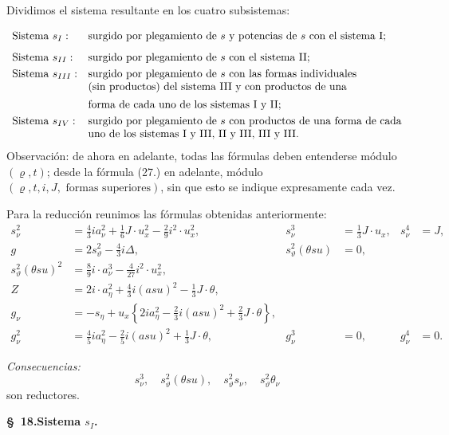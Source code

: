 \documentclass[11pt]{article}
\newcommand{\A}{\Delta}
\begin{document}
Dividimos el sistema resultante en los cuatro subsistemas:
\[
\begin{array}{ll}
\text{Sistema }s_I:&\text{surgido por plegamiento de }s\text{ y potencias de }s\text{ con el sistema I;}\vphantom{\dfrac11}\\
\text{Sistema }s_{II}:&\text{surgido por plegamiento de }s\text{ con el sistema II;}\vphantom{\dfrac11}\\
\text{Sistema }s_{III}:&\text{surgido por plegamiento de }s\text{ con las formas individuales}\\
&\text{(sin productos) del sistema III y con productos de una}\\
&\text{forma de cada uno de los sistemas I y II;}\vphantom{\dfrac11}\\
\text{Sistema }s_{IV}:&\text{surgido por plegamiento de }s\text{ con productos de una forma de cada}\\
&\text{uno de los sistemas I y III, II y III, III y III.}
\end{array}
\]
Observación: de ahora en adelante, todas las fórmulas deben entenderse módulo $(\varrho,t)$; desde la fórmula (27.) en adelante, módulo $(\varrho,t,i,J,\text{ formas superiores})$, sin que esto se indique expresamente cada vez.

Para la reducción reunimos las fórmulas obtenidas anteriormente:
\[
\tag{24}
\begin{aligned}
s_\nu^2&=\frac43ia_\nu^2+\frac16J\cdot u_x^2-\frac29i^2\cdot u_x^2,
& s_\nu^3&=\frac13J\cdot u_x,
& s_\nu^4&=J,\\[0.3em]
g&=2s_\vartheta^2-\frac43i\A,
& s_\vartheta^2(\theta su)&=0,\\[0.3em]
s_\vartheta^2(\theta su)^2&=\frac89i\cdot a_\nu^3-\frac4{27}i^2\cdot u_x^2,\\[0.3em]
Z&=2i\cdot a_\eta^2+\frac43i(asu)^2-\frac13J\cdot\theta,\\[0.3em]
g_\nu&=-s_\eta+u_x\left\{2ia_\eta^2-\frac23i(asu)^2+\frac23J\cdot\theta\right\},\\[0.3em]
g_\nu^2&=\frac45ia_\eta^2-\frac25i(asu)^2+\frac13J\cdot\theta,
&g_\nu^3&=0,
&g_\nu^4&=0.
\end{aligned}
\]

\noindent\emph{Consecuencias:}
\[
 s_\nu^3,
\quad s_\vartheta^2(\theta su),
\quad s_\vartheta^2s_\nu,
\quad s_\vartheta^2\theta_\nu
\]
son reductores.



\clearpage
\begin{center}
\textbf{\S\ 18.\quad Sistema $s_I$.}
\end{center}
\end{document}

